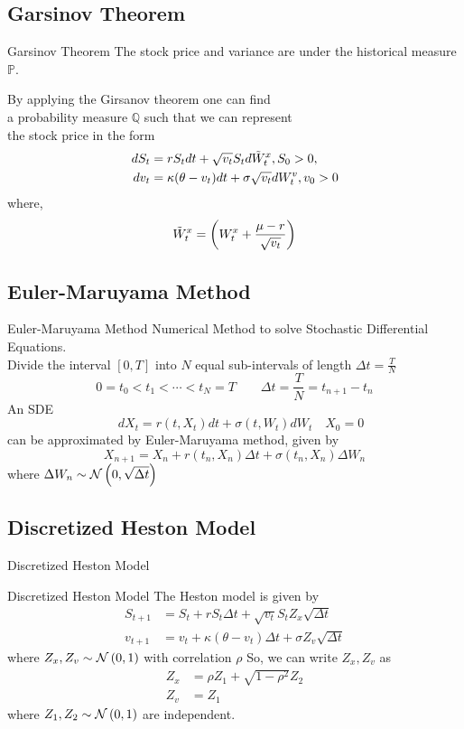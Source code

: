 \subsection{Garsinov Theorem}
\begin{frame}{Garsinov Theorem}
	The stock price and variance are under
	the historical measure $\mathbb{P}$. \\
	\vspace{0.5cm}

	By applying the Girsanov theorem one can find \\
	a probability measure $\mathbb{Q}$ such that we can represent \\
	the stock price in the form
	\begin{align*}
		dS_t &=  rS_t dt+ \sqrt{v_t}S_t d\Tilde{W}^x_t , S_0 > 0,\\
		dv_t &= \kappa( \theta - v_t)dt+ \sigma\sqrt{v_t}dW^v_t , v_0 > 0
		\label{eq:girsanov-heston-sde}
	\end{align*}
	where,
	\[
		\Tilde{W}^x_t = \left(W^x_t + \frac{\mu - r}{\sqrt{v_t}}\right)
	\]
\end{frame}

\subsection{Euler-Maruyama Method}
\begin{frame}{Euler-Maruyama Method}
	Numerical Method to solve Stochastic Differential Equations. \\
	Divide the interval \([0, T]\) into \( N \) equal sub-intervals
	of length \( \Delta t = \frac{T}{N} \)
	\[
		0 = t_0 < t_1 < \cdots < t_N = T
		\quad \quad \Delta t = \frac{T}{N} = t_{n+1} - t_n
	\]
	An SDE
	\[ \quad dX_t = r(t, X_t)dt + \sigma(t, W_t) dW_t \quad X_0 = 0 \]
	can be approximated by Euler-Maruyama method, given by
	\[ X_{n+1} = X_n + r(t_n, X_n) \Delta t + \sigma(t_n, X_n) \Delta W_n \]
	where \( \Delta W_n \sim \mathcal{N}\left( 0, \sqrt{\Delta t} \right) \)
\end{frame}

\subsection{Discretized Heston Model}
\begin{frame}{Discretized Heston Model}
	\begin{block}{Discretized Heston Model}
		The Heston model is given by
		\begin{align*}
			S_{t+1} &= S_t + rS_t \Delta t + \sqrt{v_t} S_t Z_x
				\sqrt{\Delta t} \\
			v_{t+1} &= v_t + \kappa(\theta - v_t) \Delta t
				+ \sigma Z_v \sqrt{\Delta t}
		\end{align*}
		where \( Z_x, Z_v \sim \mathcal{N}\left( 0, 1 \right) \)
		with correlation \( \rho \)
		So, we can write \( Z_x, Z_v \) as
		\begin{align*}
			Z_x &= \rho Z_1 + \sqrt{1 - \rho^2} Z_2 \\
			Z_v &= Z_1
		\end{align*}
		where \( Z_1, Z_2 \sim \mathcal{N}\left( 0, 1 \right) \) are independent.
	\end{block}
\end{frame}


